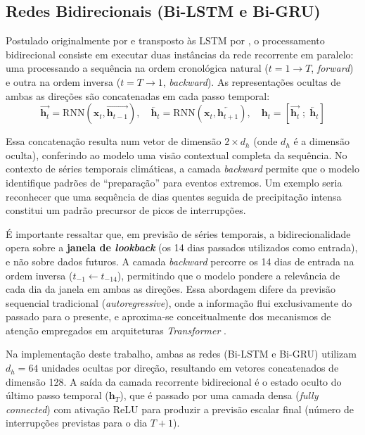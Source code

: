 \subsection{Redes Bidirecionais (Bi-LSTM e Bi-GRU)}
Postulado originalmente por \cite{schuster1997bidirectional} e transposto às LSTM por \cite{graves2005framewise}, o processamento bidirecional consiste em executar duas instâncias da rede recorrente em paralelo: uma processando a sequência na ordem cronológica natural ($t=1 \rightarrow T$, \textit{forward}) e outra na ordem inversa ($t=T \rightarrow 1$, \textit{backward}). As representações ocultas de ambas as direções são concatenadas em cada passo temporal:
\begin{equation}
    \overrightarrow{\mathbf{h}_t} = \text{RNN}(\mathbf{x}_t, \overrightarrow{\mathbf{h}_{t-1}}), \quad
    \overleftarrow{\mathbf{h}_t} = \text{RNN}(\mathbf{x}_t, \overleftarrow{\mathbf{h}_{t+1}}), \quad
    \mathbf{h}_t = [\overrightarrow{\mathbf{h}_t} \; ; \; \overleftarrow{\mathbf{h}_t}]
\end{equation}

Essa concatenação resulta num vetor de dimensão $2 \times d_h$ (onde $d_h$ é a dimensão oculta), conferindo ao modelo uma visão contextual completa da sequência. No contexto de séries temporais climáticas, a camada \textit{backward} permite que o modelo identifique padrões de ``preparação'' para eventos extremos. Um exemplo seria reconhecer que uma sequência de dias quentes seguida de precipitação intensa constitui um padrão precursor de picos de interrupções.

É importante ressaltar que, em previsão de séries temporais, a bidirecionalidade opera sobre a \textbf{janela de \textit{lookback}} (os 14 dias passados utilizados como entrada), e não sobre dados futuros. A camada \textit{backward} percorre os 14 dias de entrada na ordem inversa ($t_{-1} \leftarrow t_{-14}$), permitindo que o modelo pondere a relevância de cada dia da janela em ambas as direções. Essa abordagem difere da previsão sequencial tradicional (\textit{autoregressive}), onde a informação flui exclusivamente do passado para o presente, e aproxima-se conceitualmente dos mecanismos de atenção empregados em arquiteturas \textit{Transformer} \cite{lim2021temporal}.

Na implementação deste trabalho, ambas as redes (Bi-LSTM e Bi-GRU) utilizam $d_h = 64$ unidades ocultas por direção, resultando em vetores concatenados de dimensão 128. A saída da camada recorrente bidirecional é o estado oculto do último passo temporal ($\mathbf{h}_T$), que é passado por uma camada densa (\textit{fully connected}) com ativação ReLU para produzir a previsão escalar final (número de interrupções previstas para o dia $T+1$).

